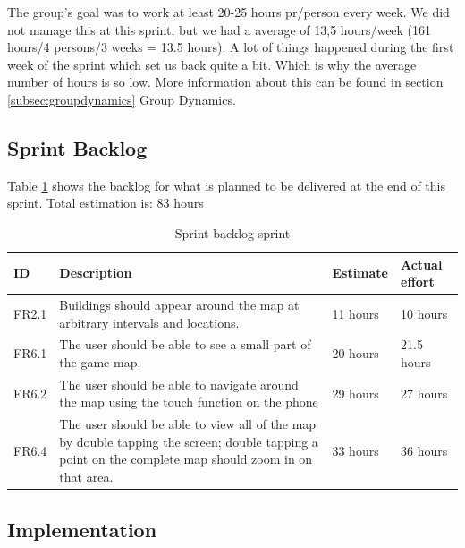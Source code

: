 	The group's goal was to work at least 20-25 hours pr/person every week. We did not manage this at this sprint, 
	but we had a average of 13,5 hours/week (161 hours/4 persons/3 weeks = 13.5 hours). A lot of things happened 
	during the first week of the sprint which set us back quite a bit. Which is why the average number of hours 
	is so low. More information about this can be found in section \ref{subsec:groupdynamics} Group Dynamics.

\subsection{Sprint Backlog}

	Table \ref{table:backlogsprint1} shows the backlog for what is planned to be delivered at the end of this sprint.
	Total estimation is: 83 hours

\begin{table}[H]
\begin{tabular}{| p{1cm} | p{7cm} | p{2cm} | p{2cm} |}
	\hline
	\rowcolor{gray}
	ID & Description & Estimate & Actual effort \\ \hline
	FR2.1 & Buildings should appear around the map at arbitrary intervals and locations. 
	& 11 hours & 10 hours \\ \hline
	FR6.1 & The user should be able to see a small part of the game map. 
	& 20 hours & 21.5 hours \\ \hline
	FR6.2 & The user should be able to navigate around the map using the touch function on the phone 
	& 29 hours & 27 hours \\ \hline
	FR6.4 & The user should be able to view all of the map by double tapping the screen; double tapping a point on the complete map should zoom in on that area. 
	& 33 hours & 36 hours \\ \hline
\end{tabular}
\caption{Sprint backlog sprint}
\label{table:backlogsprint1}
\end{table}

\subsection{Implementation}

